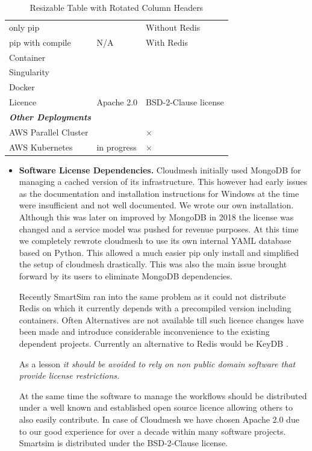 \documentclass[utf8]{FrontiersinVancouver} %
\newcommand{\YES}{\ding{51}}
\newcommand{\NO}{$\times$}
\begin{document}
\begin{table}[htbp]
{\begin{tabular}{|l|l|l|}
\hline
only pip & \YES & Without Redis \\
pip with compile & N/A & With Redis \\
Container & \YES & \YES \\
Singularity & \YES & \YES \\
Docker & \YES & \YES \\
Licence  & Apache 2.0 & BSD-2-Clause license \\
\hline
\multicolumn{3}{|l|}{\cellcolor{gray!20}\bf\em Other Deployments}\\
\hline
AWS Parallel Cluster & \YES & \NO \\ 
AWS Kubernetes  & in progress & \NO \\
\hline
\end{tabular}
}
\caption{Resizable Table with Rotated Column Headers}
\end{table}

\begin{itemize}

\item {\bf Software License Dependencies.} Cloudmesh initially used MongoDB for managing a cached version of its infrastructure. This however had early issues as the documentation and installation instructions for Windows at the time were insufficient and not well documented. We wrote our own installation. Although this was later on improved by MongoDB in 2018 the license was changed and a service model was pushed for revenue purposes. At this time we completely rewrote cloudmesh to use its own internal YAML database based on Python. This allowed 
a much easier pip only install and simplified the setup of cloudmesh drastically. This was also the main issue brought forward by its users to eliminate MongoDB dependencies. 

Recently SmartSim ran into the same problem as it could not distribute Redis on which it currently depends with a precompiled version including containers. Often Alternatives are not available till such licence changes have been made and introduce considerable inconvenience to the existing dependent projects. Currently an alternative to Redis would be KeyDB  \citep{keydb}. 

As a lesson {\em it should be avoided to rely on non public domain software that provide license restrictions.}

At the same time the software to manage the workflows should be distributed under a well known and established open source licence allowing others to also easily contribute. In case of Cloudmesh we have chosen Apache 2.0 due to our good experience for over a decade within many software projects.
Smartsim is distributed under the BSD-2-Clause license.

\end{itemize}
\end{document}
